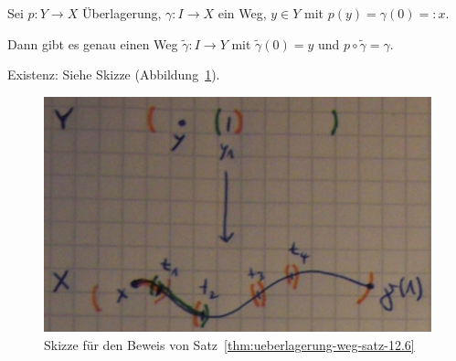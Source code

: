 \begin{satz}\label{thm:ueberlagerung-weg-satz-12.6}
    Sei $p: Y \rightarrow X$ Überlagerung, $\gamma: I \rightarrow X$
    ein Weg, $y \in Y$ mit $p(y) = \gamma(0) =: x$.

    Dann gibt es genau einen Weg $\tilde{\gamma}: I \rightarrow Y$
    mit $\tilde{\gamma}(0)=y$ und $p \circ \tilde{\gamma} = \gamma$.
\end{satz}

\begin{beweis}
Existenz: Siehe Skizze (Abbildung~\ref{fig:satz-12.6}).
    \begin{figure}
        \centering
        \includegraphics[width=0.6\linewidth, keepaspectratio]{figures/todo/skizze-1.jpg}
        \caption{Skizze für den Beweis von Satz~\ref{thm:ueberlagerung-weg-satz-12.6}}
        \label{fig:satz-12.6}
    \end{figure}
\end{beweis}


